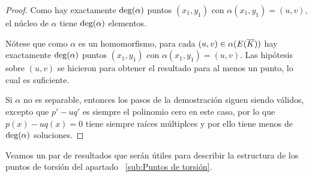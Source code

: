 \begin{proof}
	Como hay exactamente $\deg(\alpha)$ puntos $(x_1, y_1)$ con $\alpha(x_1, y_1) = (u, v)$, el núcleo de $\alpha$ tiene $\deg(\alpha)$ elementos.

	Nótese que como $\alpha$ es un homomorfismo, para cada $(u, v) \in \alpha(E(\overline{K}))$ hay exactamente $\deg(\alpha)$ puntos $(x_1, y_1)$ con $\alpha(x_1, y_1) = (u, v)$. Las hipótesis sobre $(u, v)$ se hicieron para obtener el resultado para al menos un punto, lo cual es suficiente.

	Si $\alpha$ no es separable, entonces los pasos de la demostración siguen siendo válidos, excepto que $p' - u q'$ es siempre el polinomio cero en este caso, por lo que $p(x) - u q(x) = 0$ tiene siempre raíces múltiplces y por ello tiene menos de $\deg(\alpha)$ soluciones.
\end{proof}

Veamos un par de resultados que serán útiles para describir la estructura de los puntos de torsión del apartado ~\ref{sub:Puntos de torsión}.

